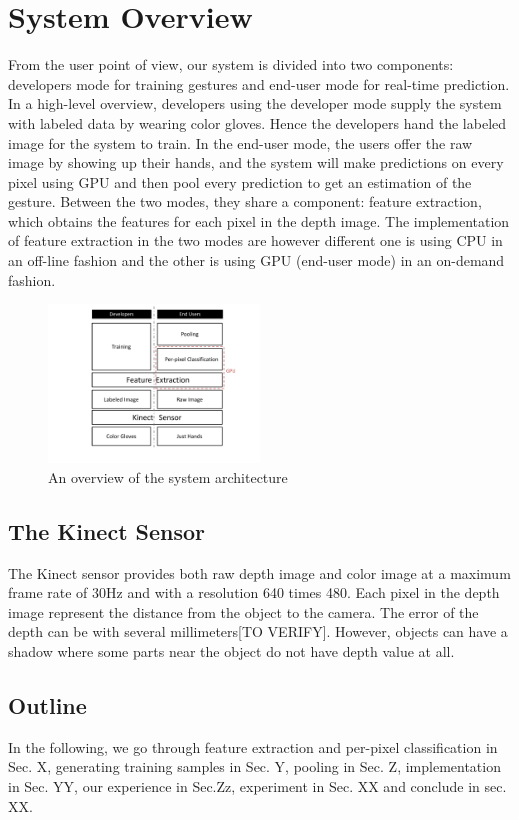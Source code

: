 \section{System Overview}

From the user point of view, our system is divided into two components: developers mode for training gestures and end-user mode for real-time prediction. In a high-level overview, developers using the developer mode supply the system with labeled data by wearing color gloves. Hence the developers hand the labeled image for the system to train. In the end-user mode, the users offer the raw image by showing up their hands, and the system will make predictions on every pixel using GPU and then pool every prediction to get an estimation of the gesture. Between the two modes, they share a component: feature extraction, which obtains the features for each pixel in the depth image. The implementation of feature extraction in the two modes are however different one is using CPU in an off-line fashion and the other is using GPU (end-user mode) in an on-demand fashion. 




\begin{figure}
\centering
	\includegraphics[width=0.5\textwidth]{fig/SystemArchitecture.pdf}
	\caption{An overview of the system architecture}
\label{fig: architecture}
\end{figure}

\subsection{The Kinect Sensor}
The Kinect sensor provides both raw depth image and color image at a maximum frame rate of 30Hz and with a resolution 640 times 480. Each pixel in the depth image represent the distance from the object to the camera. The error of the depth can be with several millimeters[TO VERIFY]. However, objects can have a shadow where some parts near the object do not have depth value at all.   

\subsection{Outline}

In the following, we go through feature extraction and per-pixel classification in Sec. X, generating training samples in Sec. Y, pooling in Sec. Z, implementation in Sec. YY, our experience in Sec.Zz, experiment in Sec. XX and conclude in sec. XX.